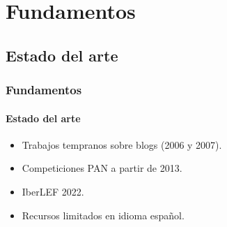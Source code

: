 \documentclass{beamer}
\begin{document}
\section{Fundamentos}
		\subsection{Estado del arte}
		\begin{frame}
			\frametitle{Fundamentos}
			\framesubtitle{Estado del arte}
			\begin{itemize}
				\item Trabajos tempranos sobre blogs (2006 y 2007). \pause
				\item Competiciones PAN a partir de 2013. \pause
				\item IberLEF 2022.\pause
				\item Recursos limitados en idioma español.\pause
			\end{itemize}
		\end{frame}
		
\end{document}

